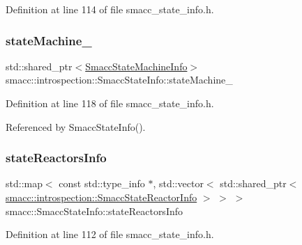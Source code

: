 Definition at line 114 of file smacc\+\_\+state\+\_\+info.\+h.

\mbox{\label{classsmacc_1_1introspection_1_1SmaccStateInfo_a74685e4540842ee292a80a1db44818bb}} 
\subsubsection{\texorpdfstring{state\+Machine\+\_\+}{stateMachine\_}}
{\footnotesize\ttfamily std\+::shared\+\_\+ptr$<$\hyperlink{classsmacc_1_1introspection_1_1SmaccStateMachineInfo}{Smacc\+State\+Machine\+Info}$>$ smacc\+::introspection\+::\+Smacc\+State\+Info\+::state\+Machine\+\_\+}



Definition at line 118 of file smacc\+\_\+state\+\_\+info.\+h.



Referenced by Smacc\+State\+Info().

\mbox{\label{classsmacc_1_1introspection_1_1SmaccStateInfo_abd1d6ca5060c87f6bd11fde3e5b2ac4d}} 
\subsubsection{\texorpdfstring{state\+Reactors\+Info}{stateReactorsInfo}}
{\footnotesize\ttfamily std\+::map$<$ const std\+::type\+\_\+info $\ast$, std\+::vector$<$ std\+::shared\+\_\+ptr$<$ \hyperlink{structsmacc_1_1introspection_1_1SmaccStateReactorInfo}{smacc\+::introspection\+::\+Smacc\+State\+Reactor\+Info} $>$ $>$ $>$ smacc\+::\+Smacc\+State\+Info\+::state\+Reactors\+Info\hspace{0.3cm}{\ttfamily [static]}}



Definition at line 112 of file smacc\+\_\+state\+\_\+info.\+h.



